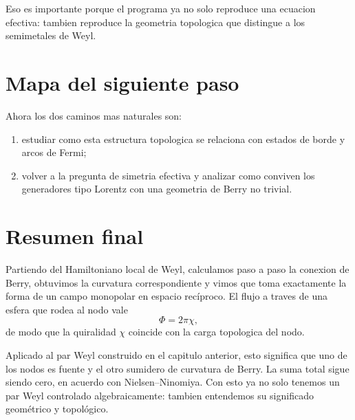Eso es importante porque el programa ya no solo reproduce una ecuacion efectiva: tambien reproduce la geometria topologica que distingue a los semimetales de Weyl.

\section{Mapa del siguiente paso}
Ahora los dos caminos mas naturales son:
\begin{enumerate}[label=\arabic*.]
    \item estudiar como esta estructura topologica se relaciona con estados de borde y arcos de Fermi;
    \item volver a la pregunta de simetria efectiva y analizar como conviven los generadores tipo Lorentz con una geometria de Berry no trivial.
\end{enumerate}

\section{Resumen final}
Partiendo del Hamiltoniano local de Weyl, calculamos paso a paso la conexion de Berry, obtuvimos la curvatura correspondiente y vimos que toma exactamente la forma de un campo monopolar en espacio recíproco. El flujo a traves de una esfera que rodea al nodo vale
\[
\Phi = 2\pi \chi,
\]
de modo que la quiralidad \(\chi\) coincide con la carga topologica del nodo.

Aplicado al par Weyl construido en el capitulo anterior, esto significa que uno de los nodos es fuente y el otro sumidero de curvatura de Berry. La suma total sigue siendo cero, en acuerdo con Nielsen--Ninomiya. Con esto ya no solo tenemos un par Weyl controlado algebraicamente: tambien entendemos su significado geométrico y topológico.
